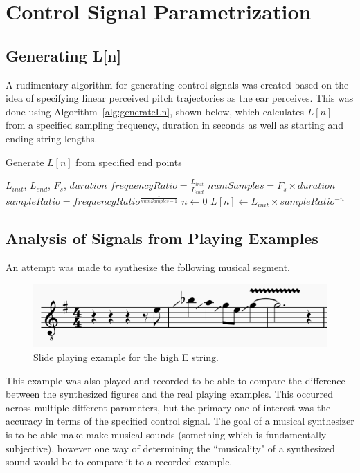 \documentclass[../main.tex]{subfiles}
\begin{document}
\section{Control Signal Parametrization}

\subsection{Generating L[n]}
A rudimentary algorithm for generating control signals was created based on the idea of specifying linear perceived pitch trajectories as the ear perceives. This was done using Algorithm~\ref{alg:generateLn}, shown below, which calculates $L[n]$ from a specified sampling frequency, duration in seconds as well as starting and ending string lengths.
\begin{algorithm}
\caption{Generate $L[n]$ from specified end points}
\label{alg:generateLn}
\begin{algorithmic}
\Require $L_{init}$, $L_{end}$, $F_s$, $duration$
\State $frequencyRatio = \frac{L_{init}}{L_{end}}$
\State $numSamples = F_s \times duration$ 
\State $sampleRatio = frequencyRatio^{\frac{1}{numSamples-1}}$  
\State $n \gets 0$
    \State $L[n] \gets L_{init} \times sampleRatio^{-n}$
\End
\end{algorithmic}
\end{algorithm}

\subsection{Analysis of Signals from Playing Examples}
An attempt was made to synthesize the following musical segment.

\begin{figure}[h]
    \centering
    \includegraphics[scale=.75]{./images/pictures/slideLick.png}
    \caption{Slide playing example for the high E string.}
    \label{fig:slideLick}
\end{figure}

This example was also played and recorded to be able to compare the difference between the synthesized figures and the real playing examples. This occurred across multiple different parameters, but the primary one of interest was the accuracy in terms of the specified control signal. The goal of a musical synthesizer is to be able make make musical sounds (something which is fundamentally subjective), however one way of determining the ``musicality" of a synthesized sound would be to compare it to a recorded example.
\end{document}
